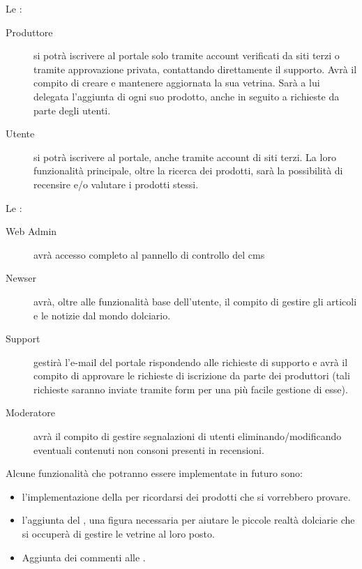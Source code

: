 \begin{description}
	\item Le : 
			\begin{description}
				\item[Produttore] si potrà iscrivere al portale solo tramite account verificati da siti terzi o tramite approvazione privata, contattando direttamente il supporto. Avrà il compito di creare e mantenere aggiornata la sua vetrina. Sarà a lui delegata l’aggiunta di ogni suo prodotto, anche in seguito a richieste da parte degli utenti.
				
				\item[Utente] si potrà iscrivere al portale, anche tramite account di siti terzi. La loro funzionalità principale, oltre la ricerca dei prodotti, sarà la possibilità di recensire e/o valutare i prodotti stessi. 
			\end{description}
			
	\item Le :
			\begin{description}
				\item[Web Admin] avrà accesso completo al pannello di controllo del \gls{cms}
				
				\item[Newser] avrà, oltre alle funzionalità base dell’utente, il compito di gestire gli articoli e le notizie dal mondo dolciario.
				
				\item[Support] gestirà l’e-mail del portale rispondendo alle richieste di supporto e avrà il compito di approvare le richieste di iscrizione da parte dei produttori (tali richieste saranno inviate tramite form per una più facile gestione di esse).
				
				\item[Moderatore] avrà il compito di gestire segnalazioni di utenti eliminando/modificando eventuali contenuti non consoni presenti in recensioni.
			\end{description}
\end{description}

Alcune funzionalità che potranno essere implementate in futuro sono: 
\begin{itemize}
	\item l’implementazione della  per ricordarsi dei prodotti che si vorrebbero provare.

	\item l’aggiunta del , una figura necessaria per aiutare le piccole realtà dolciarie che si occuperà di gestire le vetrine al loro posto.

	\item Aggiunta dei commenti alle .
\end{itemize}

